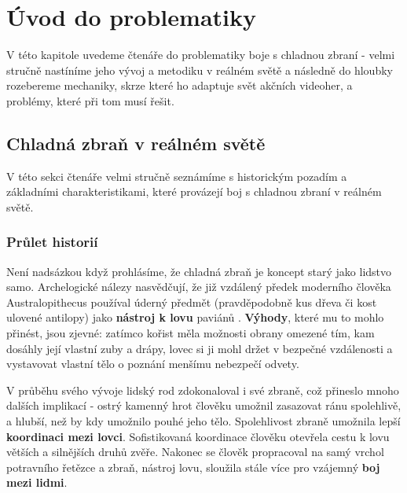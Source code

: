 \chapter{Úvod do problematiky}
V této kapitole uvedeme čtenáře do problematiky boje s chladnou zbraní - velmi stručně nastíníme jeho vývoj a metodiku v reálném světě a následně do hloubky rozebereme mechaniky, skrze které ho adaptuje svět akčních videoher, a problémy, které při tom musí řešit.


\section{Chladná zbraň v reálném světě}
V této sekci čtenáře velmi stručně seznámíme s historickým pozadím a základními charakteristikami, které provázejí boj s chladnou zbraní v reálném světě.

\subsection{Průlet historií}

Není nadsázkou když prohlásíme, že chladná zbraň je koncept starý jako lidstvo samo. Archelogické nálezy nasvědčují, že již vzdálený předek moderního člověka Australopithecus používal úderný předmět (pravděpodobně kus dřeva či kost ulovené antilopy) jako \textbf{nástroj k lovu} paviánů \cite{AustralopithecusWeapon}. \textbf{Výhody}, které mu to mohlo přinést, jsou zjevné: zatímco kořist měla možnosti obrany omezené tím, kam dosáhly její vlastní zuby a drápy, lovec si ji mohl držet v bezpečné vzdálenosti a vystavovat vlastní tělo o poznání menšímu nebezpečí odvety.

V průběhu svého vývoje lidský rod zdokonaloval i své zbraně, což přineslo mnoho dalších implikací - ostrý kamenný hrot člověku umožnil zasazovat ránu spolehlivě, a hlubší, než by kdy umožnilo pouhé jeho tělo. Spolehlivost zbraně umožnila lepší \textbf{koordinaci mezi lovci}. Sofistikovaná koordinace člověku otevřela cestu k lovu větších a silnějších druhů zvěře. Nakonec se člověk propracoval na samý vrchol potravního řetězce a zbraň, nástroj lovu, sloužila stále více pro vzájemný \textbf{boj mezi lidmi}. 

